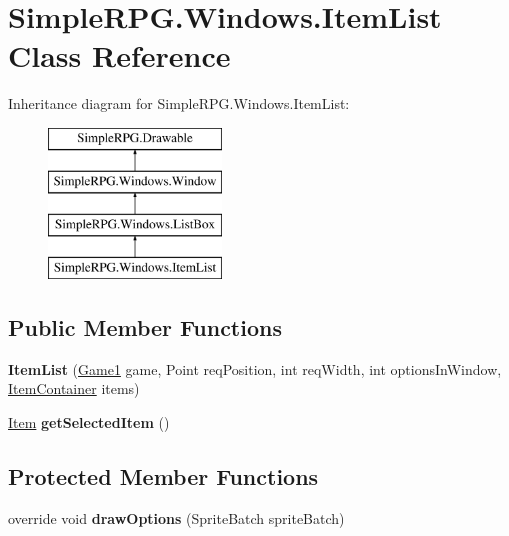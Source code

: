 \hypertarget{class_simple_r_p_g_1_1_windows_1_1_item_list}{\section{Simple\-R\-P\-G.\-Windows.\-Item\-List Class Reference}
\label{class_simple_r_p_g_1_1_windows_1_1_item_list}
}
Inheritance diagram for Simple\-R\-P\-G.\-Windows.\-Item\-List\-:\begin{figure}[H]
\begin{center}
\leavevmode
\includegraphics[height=4.000000cm]{class_simple_r_p_g_1_1_windows_1_1_item_list}
\end{center}
\end{figure}
\subsection*{Public Member Functions}
\begin{DoxyCompactItemize}
\item 
\hypertarget{class_simple_r_p_g_1_1_windows_1_1_item_list_a18f5608d7498c2c0bcefd449853a67cc}{{\bfseries Item\-List} (\hyperlink{class_simple_r_p_g_1_1_game1}{Game1} game, Point req\-Position, int req\-Width, int options\-In\-Window, \hyperlink{class_simple_r_p_g_1_1_items_1_1_item_container}{Item\-Container} items)}\label{class_simple_r_p_g_1_1_windows_1_1_item_list_a18f5608d7498c2c0bcefd449853a67cc}

\item 
\hypertarget{class_simple_r_p_g_1_1_windows_1_1_item_list_a3e66f13e5441ede760ea0354dcad386b}{\hyperlink{class_simple_r_p_g_1_1_items_1_1_item}{Item} {\bfseries get\-Selected\-Item} ()}\label{class_simple_r_p_g_1_1_windows_1_1_item_list_a3e66f13e5441ede760ea0354dcad386b}

\end{DoxyCompactItemize}
\subsection*{Protected Member Functions}
\begin{DoxyCompactItemize}
\item 
\hypertarget{class_simple_r_p_g_1_1_windows_1_1_item_list_a1a0df2d3034a3ce9dd2e98f6a1a0aed6}{override void {\bfseries draw\-Options} (Sprite\-Batch sprite\-Batch)}\label{class_simple_r_p_g_1_1_windows_1_1_item_list_a1a0df2d3034a3ce9dd2e98f6a1a0aed6}

\end{DoxyCompactItemize}
